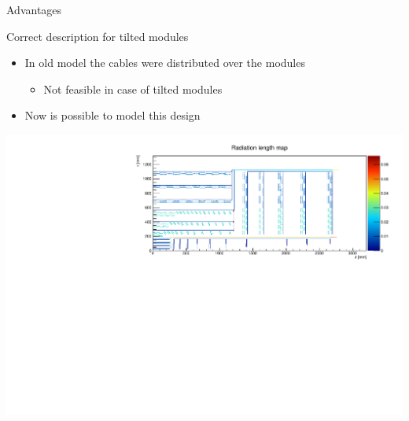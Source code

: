 \documentclass[pdftex, 11pt]{beamer}
\begin{document}
\begin{frame}{Advantages}
  \begin{block}{Correct description for \alert{tilted} modules}
    \begin{itemize}
    \item In old model the cables were distributed \alert{over} the modules
      \begin{itemize}
      \item \alert{Not} feasible in case of tilted modules
      \end{itemize}
    \item Now is \alert{possible} to model this design
    \end{itemize}
  \end{block}
  \begin{center}
    \includegraphics[width=\textwidth]{img/tilted.pdf}
  \end{center}
\end{frame}
\end{document}
